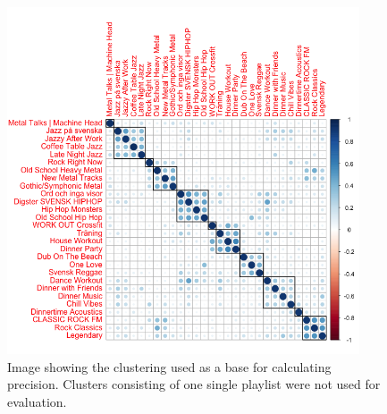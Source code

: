 \documentclass[a4paper,11pt]{kth-mag}
\begin{document}
\begin{figure}
\centering
\includegraphics[width=0.93\textwidth]{images/sumAbsAgglHierClust-better.png}
\caption{Image showing the clustering used as a base for calculating precision. Clusters consisting of one single playlist were not used for evaluation.}
\label{sumAbsBetter}
\end{figure}
\end{document}
